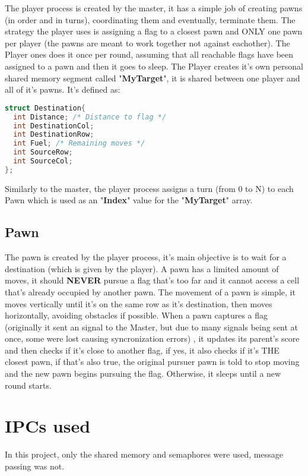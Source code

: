 \documentclass[11pt]{article}
\begin{document}
The player process is created by the master, it has a simple job of creating pawns (in order and in turns), coordinating them and eventually, terminate them. The strategy the player uses is assigning a flag to a closest pawn and ONLY one pawn per player (the pawns are meant to work together not against eachother). The Player ones does it once per round, assuming that all reachable flags have been assigned to a pawn and then it goes to sleep. The Player creates it's own personal shared memory segment called "\textbf{MyTarget}", it is shared between one player and all of it's pawns. It's defined as:
	\begin{lstlisting}[language=C]
struct Destination{
  int Distance; /* Distance to flag */
  int DestinationCol; 
  int DestinationRow;
  int Fuel; /* Remaining moves */
  int SourceRow;
  int SourceCol;
};
	\end{lstlisting}
	
	Similarly to the master, the player process assigns a turn (from 0 to N) to each Pawn which is used as an "\textbf{Index}" value for the "\textbf{MyTarget}" array.

\subsection{Pawn}

The pawn is created by the player process, it's main objective is to wait for a destination (which is given by the player). A pawn has a limited amount of moves, it should \textbf{NEVER} pursue a flag that's too far and it cannot access a cell that's already occupied by another pawn. The movement of a pawn is simple, it moves vertically until it's on the same row as it's destination, then moves horizontally, avoiding obstacles if possible. When a pawn captures a flag (originally it sent an signal to the Master, but due to many signals being sent at once, some were lost causing syncronization errors) , it updates its parent's score and then checks if it's close to another flag, if yes, it also checks if it's THE closest pawn, if that's also true, the original pursuer pawn is told to stop moving and the new pawn begins pursuing the flag. Otherwise, it sleeps until a new round starts.

\section{IPCs used}

In this project, only the shared memory and semaphores were used, message passing was not.
\end{document}
